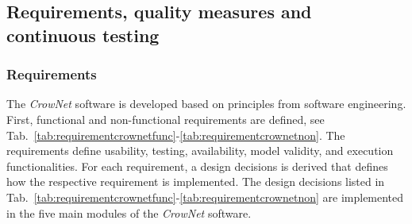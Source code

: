 %




\subsection{Requirements, quality measures and continuous testing}
\label{sec:requirementglobal}


\subsubsection{Requirements}

The \textit{CrowNet} software is developed based on principles from software engineering. First, functional and non-functional requirements are defined, see Tab.~\ref{tab:requirementcrownetfunc}-\ref{tab:requirementcrownetnon}. The requirements define usability, testing, availability, model validity, and execution functionalities. For each requirement, a design decisions is derived that defines how the respective requirement is implemented. The design decisions listed in Tab.~\ref{tab:requirementcrownetfunc}-\ref{tab:requirementcrownetnon} are implemented in the five main modules of the \textit{CrowNet} software.  





